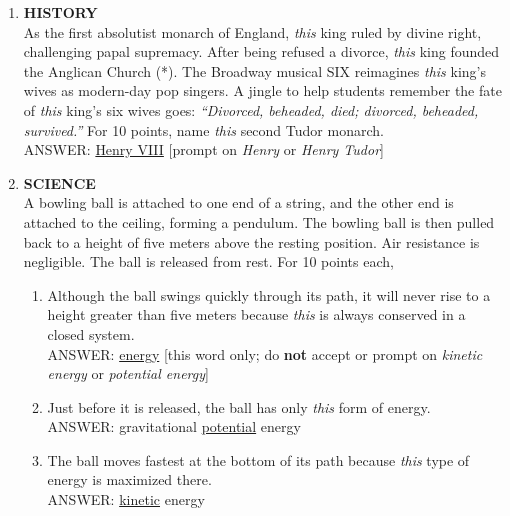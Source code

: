 \documentclass{report}
\newcommand*{\backtrack}{\setcounter{enumi}{\numexpr\theenumi-1\relax}}
\begin{document}
\begin{enumerate}

    \item \textbf{HISTORY} \\ As the first absolutist monarch of England, \textit{this} king ruled by divine right, challenging papal supremacy. After being refused a divorce, \textit{this} king founded the Anglican Church (*). The Broadway musical SIX reimagines \textit{this} king’s wives as modern-day pop singers. A jingle to help students remember the fate of \textit{this} king’s six wives goes: \textit{“Divorced, beheaded, died; divorced, beheaded, survived.”} For 10 points, name \textit{this} second Tudor monarch. \\ ANSWER: \underline{Henry VIII} [prompt on \textit{Henry} or \textit{Henry Tudor}] \backtrack
    \item \textbf{SCIENCE} \\ A bowling ball is attached to one end of a string, and the other end is attached to the ceiling, forming a pendulum. The bowling ball is then pulled back to a height of five meters above the resting position. Air resistance is negligible. The ball is released from rest. For 10 points each,
    \begin{enumerate}[label=\Alph*]
        \item Although the ball swings quickly through its path, it will never rise to a height greater than five meters because \textit{this} is always conserved in a closed system. \\ ANSWER: \underline{energy} [this word only; do \textbf{not} accept or prompt on \textit{kinetic energy} or \textit{potential energy}]
        \item Just before it is released, the ball has only \textit{this} form of energy. \\ ANSWER: gravitational \underline{potential} energy
        \item The ball moves fastest at the bottom of its path because \textit{this} type of energy is maximized there. \\ ANSWER: \underline{kinetic} energy
    \end{enumerate}
    

\end{enumerate}
\end{document}
